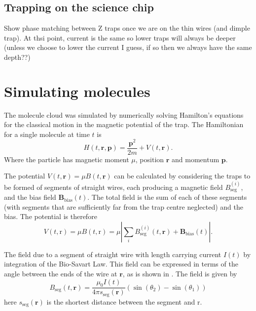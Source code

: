 \subsection{Trapping on the science chip}


Show phase matching between Z traps once we are on the thin wires (and dimple
trap). At thsi point, current is the same so lower traps will always be deeper
(unless we choose to lower the current I guess, if so then we always have the
same depth??)



\section{Simulating molecules}
\label{design:sim}


The molecule cloud was simulated by numerically solving Hamilton's equations
for the classical motion in the magnetic potential of the trap. The Hamiltonian
for a single molecule at time $t$ is
%
\begin{equation}
  H(t, \mathbf{r}, \mathbf{p}) = \frac{\mathbf{p}^2}{2m} + V(t, \mathbf{r}).
\end{equation}
Where the particle has magnetic moment $\mu$, position $\mathbf{r}$ and
momentum $\mathbf{p}$.

The potential $V(t, \mathbf{r}) = \mu B(t, \mathbf{r})$ can be calculated by
considering the traps to be formed of segments of straight wires, each
producing a magnetic field $B_\text{seg}^{(i)}$, and the bias field
$\mathbf{B}_\text{bias}(t)$. The total field is the sum of each of these
segments (with segments that are sufficiently far from the trap centre
neglected) and the bias. The potential is therefore
%
\begin{equation}
  V(t, \mathrm{r}) = \mu B (t, \mathrm{r}) = \mu \left| \sum_i
  B_\text{seg}^{(i)}(t, \mathbf{r}) +
  \mathbf{B}_\text{bias}(t)\right|.
\end{equation}

The field due to a segment of straight wire with length carrying current $I(t)$
 by integration of the Bio-Savart Law.
This field can be expressed in terms of the angle between the ends of the wire
at $\mathbf{r}$, as is shown in . The field
is given by~\cite{Griffiths2017}
%
\begin{equation}
  B_\text{seg}(t, \mathbf{r}) = \frac{\mu_0 I(t)}{4\pi
  s_\text{seg}(\mathbf{r})} (\sin(\theta_2)  - \sin(\theta_1))
\end{equation}
here $s_\text{seg}(\mathbf{r})$ is the shortest distance between the segment
and $\mathrm{r}$.

